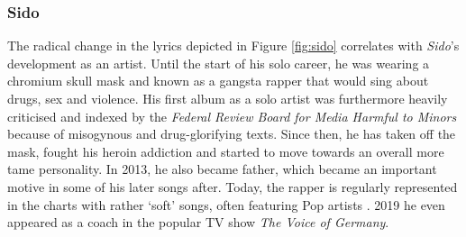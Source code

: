 \documentclass[conference]{IEEEtran}
\begin{document}
\subsubsection{Sido}
The radical change in the lyrics depicted in Figure \ref{fig:sido} correlates with \textit{Sido}'s development as an artist. Until the start of his solo career, he was wearing a chromium skull mask and known as a gangsta rapper that would sing about drugs, sex and violence. His first album as a solo artist was furthermore heavily criticised and indexed \cite{urteil} by the \textit{Federal Review Board for Media Harmful to Minors} \cite{bpjm} because of misogynous and drug-glorifying texts. Since then, he has taken off the mask, fought his heroin addiction and started to move towards an overall more tame personality. In 2013, he also became father, which became an important motive in some of his later songs after. Today, the rapper is regularly represented in the charts with rather {\lq}soft{\rq} songs, often featuring Pop artists \cite{sido_charts}. 2019 he even appeared as a coach in the popular TV show \textit{The Voice of Germany}.
\end{document}
